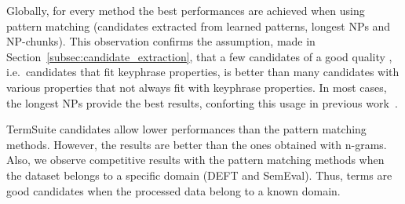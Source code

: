       Globally, for every method the best performances are achieved when using
      pattern matching (candidates extracted from learned patterns, longest NPs
      and NP-chunks). This observation confirms the assumption, made in
      Section~\ref{subsec:candidate_extraction}, that a few candidates of a good
      quality , i.e.~candidates that fit keyphrase properties, is better than
      many candidates with various properties that not always fit with keyphrase
      properties. In most cases, the longest NPs provide the best results,
      conforting this usage in previous
      work~\cite{wan2008expandrank,hassan2010conundrums,bougouin2013topicrank}.

      TermSuite candidates allow lower performances than the pattern matching
      methods. However, the results are better than the ones obtained with
      n-grams. Also, we observe competitive results with the pattern matching
      methods when the dataset belongs to a specific domain (DEFT and SemEval).
      Thus, terms are good candidates when the processed data belong to a known
      domain.

